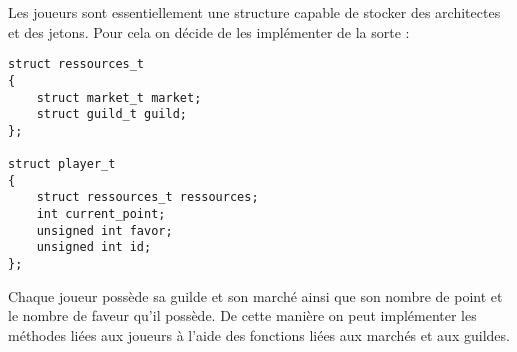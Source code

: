 
\label{players}

Les joueurs sont essentiellement une structure capable de stocker des architectes et des jetons. Pour cela on décide de les implémenter de la sorte : 

\begin{lstlisting}[frame=single, caption={Implémentation des joueurs}]
struct ressources_t 
{
	struct market_t market;
	struct guild_t guild;
};

struct player_t
{
	struct ressources_t ressources;
	int current_point;
	unsigned int favor;
	unsigned int id;
};
\end{lstlisting}

Chaque joueur possède sa guilde et son marché ainsi que son nombre de point et le nombre de faveur qu'il possède. De cette manière on peut implémenter les méthodes liées aux joueurs à l'aide des fonctions liées aux marchés et aux guildes.